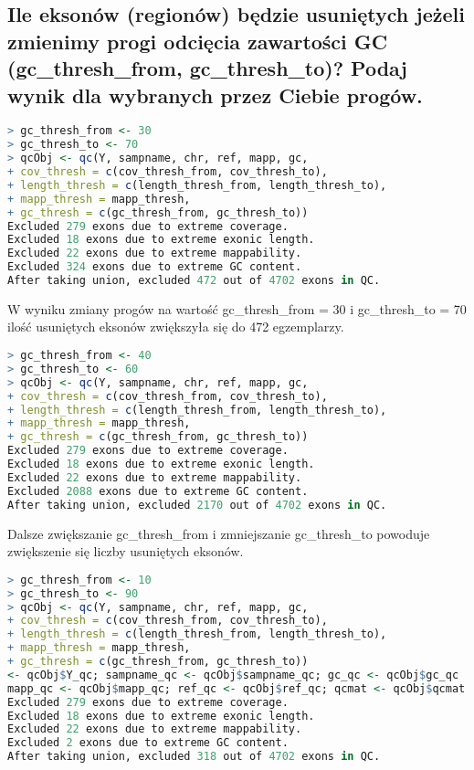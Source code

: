 \documentclass{article}
\begin{document}
\subsection{Ile eksonów (regionów) będzie usuniętych jeżeli zmienimy progi odcięcia zawartości GC (gc\_thresh\_from, gc\_thresh\_to)? Podaj wynik dla wybranych przez Ciebie progów.}
\begin{lstlisting}[language=R]
> gc_thresh_from <- 30
> gc_thresh_to <- 70 
> qcObj <- qc(Y, sampname, chr, ref, mapp, gc,
+ cov_thresh = c(cov_thresh_from, cov_thresh_to),
+ length_thresh = c(length_thresh_from, length_thresh_to),       
+ mapp_thresh = mapp_thresh,
+ gc_thresh = c(gc_thresh_from, gc_thresh_to))
Excluded 279 exons due to extreme coverage.
Excluded 18 exons due to extreme exonic length.
Excluded 22 exons due to extreme mappability.
Excluded 324 exons due to extreme GC content.
After taking union, excluded 472 out of 4702 exons in QC. 
\end{lstlisting}
W wyniku zmiany progów na wartość gc\_thresh\_from = 30 i gc\_thresh\_to = 70 ilość usuniętych eksonów zwiększyła się do 472 egzemplarzy.
\begin{lstlisting}[language=R]
> gc_thresh_from <- 40
> gc_thresh_to <- 60 
> qcObj <- qc(Y, sampname, chr, ref, mapp, gc,
+ cov_thresh = c(cov_thresh_from, cov_thresh_to),
+ length_thresh = c(length_thresh_from, length_thresh_to),       
+ mapp_thresh = mapp_thresh,
+ gc_thresh = c(gc_thresh_from, gc_thresh_to))
Excluded 279 exons due to extreme coverage.
Excluded 18 exons due to extreme exonic length.
Excluded 22 exons due to extreme mappability.
Excluded 2088 exons due to extreme GC content.
After taking union, excluded 2170 out of 4702 exons in QC.  
\end{lstlisting}
Dalsze zwiększanie gc\_thresh\_from i zmniejszanie gc\_thresh\_to powoduje zwiększenie się liczby usuniętych eksonów.
\begin{lstlisting}[language=R]
> gc_thresh_from <- 10
> gc_thresh_to <- 90
> qcObj <- qc(Y, sampname, chr, ref, mapp, gc,
+ cov_thresh = c(cov_thresh_from, cov_thresh_to),
+ length_thresh = c(length_thresh_from, length_thresh_to),
+ mapp_thresh = mapp_thresh,
+ gc_thresh = c(gc_thresh_from, gc_thresh_to))
<- qcObj$Y_qc; sampname_qc <- qcObj$sampname_qc; gc_qc <- qcObj$gc_qc
mapp_qc <- qcObj$mapp_qc; ref_qc <- qcObj$ref_qc; qcmat <- qcObj$qcmat
Excluded 279 exons due to extreme coverage.
Excluded 18 exons due to extreme exonic length.
Excluded 22 exons due to extreme mappability.
Excluded 2 exons due to extreme GC content.
After taking union, excluded 318 out of 4702 exons in QC. 
\end{lstlisting}
\end{document}
